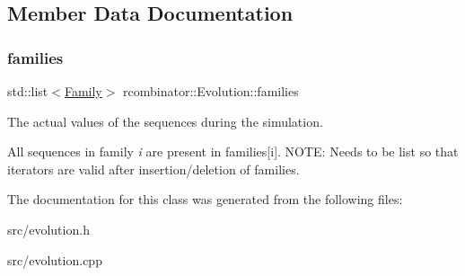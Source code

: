 \subsection{Member Data Documentation}
\mbox{\label{classrcombinator_1_1Evolution_a32a114f62cd6b0f075b8dc47fe86514e}} 
\subsubsection{\texorpdfstring{families}{families}}
{\footnotesize\ttfamily std\+::list$<$\mbox{\hyperlink{classrcombinator_1_1Family}{Family}}$>$ rcombinator\+::\+Evolution\+::families\hspace{0.3cm}{\ttfamily [protected]}}



The actual values of the sequences during the simulation. 

All sequences in family {\itshape i} are present in families\mbox{[}i\mbox{]}. N\+O\+TE\+: Needs to be list so that iterators are valid after insertion/deletion of families. 

The documentation for this class was generated from the following files\+:\begin{DoxyCompactItemize}
\item 
src/evolution.\+h\item 
src/evolution.\+cpp\end{DoxyCompactItemize}
